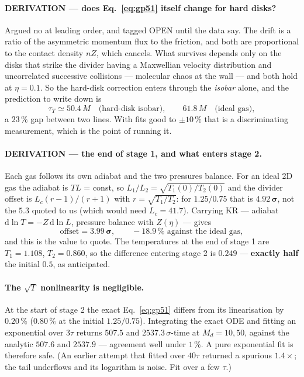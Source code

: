 \documentclass[11pt,a4paper]{article}
\newcommand{\dd}{\mathrm{d}}
\begin{document}
\paragraph{DERIVATION --- does Eq.~\eqref{eq:gp51} itself change for hard disks?} Argued no at
leading order, and tagged OPEN until the data say. The drift is a ratio of the asymmetric momentum
flux to the friction, and both are proportional to the contact density $nZ$, which cancels. What
survives depends only on the disks that strike the divider having a Maxwellian velocity
distribution and uncorrelated successive collisions --- molecular chaos at the wall --- and both
hold at $\eta = 0.1$. So the hard-disk correction enters through the \emph{isobar} alone, and the
prediction to write down is
\begin{equation}
\tau_T \simeq 50.4\,M\quad\text{(hard-disk isobar)},\qquad 61.8\,M\quad\text{(ideal gas)} ,
\end{equation}
a $23\,\%$ gap between two lines. With fits good to $\pm10\,\%$ that is a discriminating
measurement, which is the point of running it.

\paragraph{DERIVATION --- the end of stage 1, and what enters stage 2.} Each gas follows its own
adiabat and the two pressures balance. For an ideal 2D gas the adiabat is $TL$ = const, so
$L_1/L_2 = \sqrt{T_1(0)/T_2(0)}$ and the divider offset is $L_c(r-1)/(r+1)$ with
$r = \sqrt{T_1/T_2}$: for $1.25/0.75$ that is $\mathbf{4.92\,\sigma}$, not the $5.3$ quoted to us
(which would need $L_c = 41.7$). Carrying KR --- adiabat $\dd\ln T = -Z\,\dd\ln L$, pressure balance
with $Z(\eta)$ --- gives
\begin{equation}
\text{offset} = \mathbf{3.99\,\sigma},\qquad -18.9\,\% \text{ against the ideal gas},
\end{equation}
and this is the value to quote. The temperatures at the end of stage 1 are $T_1 = 1.108$,
$T_2 = 0.860$, so the difference entering stage 2 is $0.249$ --- \textbf{exactly half} the initial
$0.5$, as anticipated.

\paragraph{The $\sqrt T$ nonlinearity is negligible.} At the start of stage 2 the exact
Eq.~\eqref{eq:gp51} differs from its linearisation by $0.20\,\%$ ($0.80\,\%$ at the initial
$1.25/0.75$). Integrating the exact ODE and fitting an exponential over $3\tau$ returns
$507.5$ and $2537.3\,\sigma$-time at $M_d = 10, 50$, against the analytic $507.6$ and $2537.9$ ---
agreement well under $1\,\%$. A pure exponential fit is therefore safe. (An earlier attempt that
fitted over $40\tau$ returned a spurious $1.4\times$; the tail underflows and its logarithm is
noise. Fit over a few $\tau$.)
\end{document}
